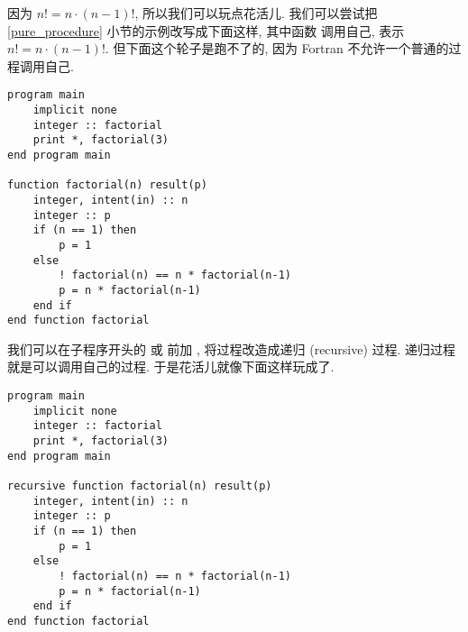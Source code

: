 因为 $n!=n\cdot(n-1)!$, 所以我们可以玩点花活儿. 我们可以尝试把 \ref{pure_procedure} 小节的示例改写成下面这样, 其中函数  调用自己, 表示 $n!=n\cdot(n-1)!$. 但下面这个轮子是跑不了的, 因为 Fortran 不允许一个普通的过程调用自己.
\begin{lstlisting}
program main
    implicit none
    integer :: factorial
    print *, factorial(3)
end program main

function factorial(n) result(p)
    integer, intent(in) :: n
    integer :: p
    if (n == 1) then
        p = 1
    else
        ! factorial(n) == n * factorial(n-1)
        p = n * factorial(n-1)
    end if
end function factorial
\end{lstlisting}
我们可以在子程序开头的  或  前加 , 将过程改造成递归 (recursive) 过程. 递归过程就是可以调用自己的过程. 于是花活儿就像下面这样玩成了.
\begin{lstlisting}
program main
    implicit none
    integer :: factorial
    print *, factorial(3)
end program main

recursive function factorial(n) result(p)
    integer, intent(in) :: n
    integer :: p
    if (n == 1) then
        p = 1
    else
        ! factorial(n) == n * factorial(n-1)
        p = n * factorial(n-1)
    end if
end function factorial
\end{lstlisting}

